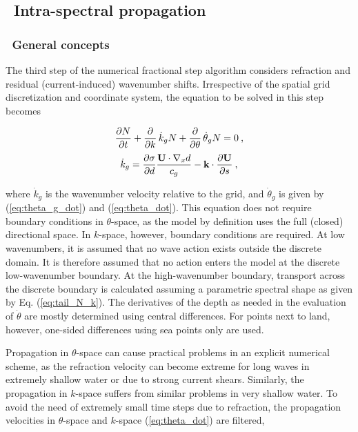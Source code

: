 \vssub
\subsection{~Intra-spectral propagation} \label{sub:spec}
\vssub
\subsubsection{~General concepts}
\vsssub

The third step of the numerical fractional step algorithm considers refraction
and residual (current-induced) wavenumber shifts. Irrespective of the spatial
grid discretization and coordinate system, the equation to be solved in this
step becomes


\begin{equation}
\frac{\p N}{\p t} + \frac{\p}{\p k} \, \dot{k}_g N +
\frac{\p}{\p \theta} \, \dot{\theta}_g N = 0
\: , \label{eq:step_intra} \end{equation} \begin{equation}
\dot{k}_g  = \frac{\p \sigma}{\p d} 
    \frac{{\bf U} \cdot \nabla_x d}{c_g}  -
    {\bf k} \cdot \frac{\p {\bf U}}{\p s}
\: , \label{eq:k_dot_g} \end{equation}

\noindent
where $\dot{k}_g$ is the wavenumber velocity relative to the grid, and
$\dot{\theta}_g$ is given by (\ref{eq:theta_g_dot}) and (\ref{eq:theta_dot}).
This equation does not require boundary conditions in $\theta$-space, as the
model by definition uses the full (closed) directional space. In $k$-space,
however, boundary conditions are required. At low wavenumbers, it is assumed
that no wave action exists outside the discrete domain. It is therefore
assumed that no action enters the model at the discrete low-wavenumber
boundary. At the high-wavenumber boundary, transport across the discrete
boundary is calculated assuming a parametric spectral shape as given by
Eq. (\ref{eq:tail_N_k}). The derivatives of the depth as needed in the
evaluation of $\dot{\theta}$ are mostly determined using central
differences. For points next to land, however, one-sided differences using sea
points only are used.

Propagation in $\theta$-space can cause practical problems in an explicit
numerical scheme, as the refraction velocity can become extreme for long waves
in extremely shallow water or due to strong current shears. Similarly, 
the propagation in $k$-space suffers from similar problems in very shallow water. 
To avoid the need of extremely small time steps
due to refraction, the propagation velocities in $\theta$-space and $k$-space
(\ref{eq:theta_dot}) are filtered,

